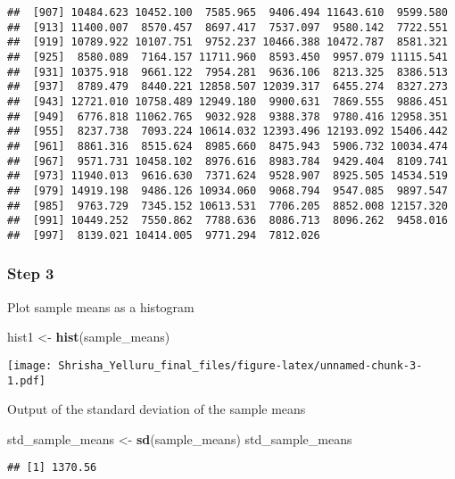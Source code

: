 \documentclass[]{article}
\newenvironment{Shaded}{\begin{snugshade}}{\end{snugshade}}
\newcommand{\KeywordTok}[1]{\textcolor[rgb]{0.13,0.29,0.53}{\textbf{#1}}}
\newcommand{\StringTok}[1]{\textcolor[rgb]{0.31,0.60,0.02}{#1}}
\newcommand{\NormalTok}[1]{#1}
\begin{document}
\begin{verbatim}
##  [907] 10484.623 10452.100  7585.965  9406.494 11643.610  9599.580
##  [913] 11400.007  8570.457  8697.417  7537.097  9580.142  7722.551
##  [919] 10789.922 10107.751  9752.237 10466.388 10472.787  8581.321
##  [925]  8580.089  7164.157 11711.960  8593.450  9957.079 11115.541
##  [931] 10375.918  9661.122  7954.281  9636.106  8213.325  8386.513
##  [937]  8789.479  8440.221 12858.507 12039.317  6455.274  8327.273
##  [943] 12721.010 10758.489 12949.180  9900.631  7869.555  9886.451
##  [949]  6776.818 11062.765  9032.928  9388.378  9780.416 12958.351
##  [955]  8237.738  7093.224 10614.032 12393.496 12193.092 15406.442
##  [961]  8861.316  8515.624  8985.660  8475.943  5906.732 10034.474
##  [967]  9571.731 10458.102  8976.616  8983.784  9429.404  8109.741
##  [973] 11940.013  9616.630  7371.624  9528.907  8925.505 14534.519
##  [979] 14919.198  9486.126 10934.060  9068.794  9547.085  9897.547
##  [985]  9763.729  7345.152 10613.531  7706.205  8852.008 12157.320
##  [991] 10449.252  7550.862  7788.636  8086.713  8096.262  9458.016
##  [997]  8139.021 10414.005  9771.294  7812.026
\end{verbatim}

\subsubsection{Step 3}\label{step-3}

Plot sample means as a histogram

\begin{Shaded}
\begin{Highlighting}[]
\NormalTok{hist1 <-}\StringTok{  }\KeywordTok{hist}\NormalTok{(sample_means)}
\end{Highlighting}
\end{Shaded}

\texttt{[image: Shrisha\_Yelluru\_final\_files/figure-latex/unnamed-chunk-3-1.pdf]}

Output of the standard deviation of the sample means

\begin{Shaded}
\begin{Highlighting}[]
\NormalTok{std_sample_means <-}\StringTok{ }\KeywordTok{sd}\NormalTok{(sample_means)   }
\NormalTok{std_sample_means}
\end{Highlighting}
\end{Shaded}

\begin{verbatim}
## [1] 1370.56
\end{verbatim}
\end{document}

